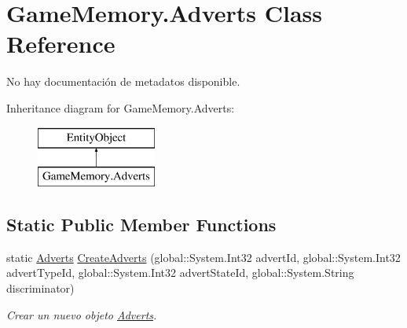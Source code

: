 \hypertarget{class_game_memory_1_1_adverts}{\section{Game\-Memory.\-Adverts Class Reference}
\label{class_game_memory_1_1_adverts}
}


No hay documentación de metadatos disponible.  


Inheritance diagram for Game\-Memory.\-Adverts\-:\begin{figure}[H]
\begin{center}
\leavevmode
\includegraphics[height=2.000000cm]{class_game_memory_1_1_adverts}
\end{center}
\end{figure}
\subsection*{Static Public Member Functions}
\begin{DoxyCompactItemize}
\item 
static \hyperlink{class_game_memory_1_1_adverts}{Adverts} \hyperlink{class_game_memory_1_1_adverts_a7a0587b12eea6e049be8282653ad83a6}{Create\-Adverts} (global\-::\-System.\-Int32 advert\-Id, global\-::\-System.\-Int32 advert\-Type\-Id, global\-::\-System.\-Int32 advert\-State\-Id, global\-::\-System.\-String discriminator)
\begin{DoxyCompactList}\small\item\em Crear un nuevo objeto \hyperlink{class_game_memory_1_1_adverts}{Adverts}. \end{DoxyCompactList}\end{DoxyCompactItemize}
